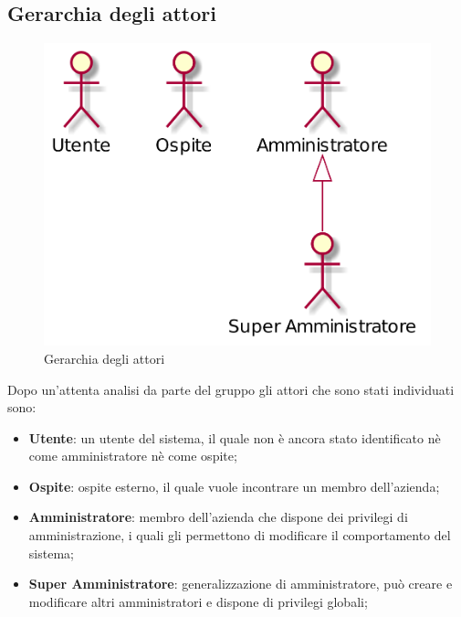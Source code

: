 \subsection{Gerarchia degli attori}
\begin{figure}[h]
  \centering
  \includegraphics[scale=0.4]{images/Attori.png}
  \caption{Gerarchia degli attori}
\end{figure}
Dopo un'attenta analisi da parte del gruppo gli attori che sono stati individuati sono: 
\begin{itemize}
\item \textbf{Utente}: un utente del sistema, il quale non è ancora stato identificato nè come amministratore nè come ospite;
\item \textbf{Ospite}: ospite esterno, il quale vuole incontrare un membro dell'azienda;
\item \textbf{Amministratore}: membro dell'azienda che dispone dei privilegi di amministrazione, i quali gli permettono di modificare il comportamento del sistema;
\item \textbf{Super Amministratore}: generalizzazione di amministratore, può creare e modificare altri amministratori e dispone di privilegi globali;
\end{itemize}